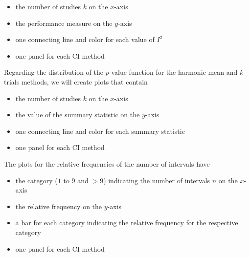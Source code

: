 \documentclass[letterpaper, 12pt]{article}
\begin{document}
\begin{itemize}
\item the number of studies $k$ on the $x$-axis
\item the performance measure on the $y$-axis
\item one connecting line and color for each value of $I^2$
\item one panel for each CI method
\end{itemize}

Regarding the distribution of the $p$-value function for the harmonic mean
and $k$-trials methods, we will create plots that contain
\begin{itemize}
\item the number of studies $k$ on the $x$-axis
\item the value of the summary statistic on the $y$-axis
\item one connecting line and color for each summary statistic
\item one panel for each CI method
\end{itemize}

The plots for the relative frequencies of the number of intervals have
\begin{itemize}
\item the category ($1$ to $9$ and $>9$) indicating the number of intervals
  $n$ on the $x$-axis
\item the relative frequency on the $y$-axis
\item a bar for each category indicating the relative frequency for the
  respective category
\item one panel for each CI method
\end{itemize}


\newpage


\end{document}
